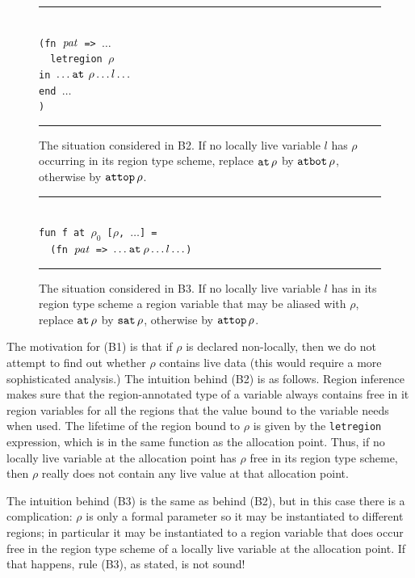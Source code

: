 \documentclass[12pt]{book}
\begin{document}
\begin{figure}
\hrule
\begin{center}
\begin{tabbing}
\\
\hskip3cm\=\tt (fn ${\it pat}$ => $\ldots$\\
       \>\ \ \=\tt letregion $\rho$ \\
       \>    \>\tt in  $\ldots\mathbin{\hbox{\tt at}}\,\rho\ldots l \ldots$\\
       \>    \>\tt end $\ldots$\\
       \>\tt )
\end{tabbing}
\end{center}
\caption{The situation considered in B2. If no locally live variable
  $l$ has $\rho$ occurring in its region type scheme, replace
  $\mathbin{\hbox{\tt at}}\,\rho$ by $\hbox{\tt atbot}\,\rho$, otherwise by $\hbox{\tt attop}\,\rho$.}
\medskip

\hrule
\label{b2.fig}
\end{figure}
\begin{figure}
\hrule
\begin{center}
\begin{tabbing}
\\
\hskip3cm\=\tt fun f at $\rho_0$ [$\rho$, $\ldots$] = \\
         \>\tt \ \ \=\tt (fn ${\it pat}$ => $\ldots\mathbin{\hbox{\tt at}}\rho\ldots l\ldots$)
\end{tabbing}
\end{center}
\caption{The situation considered in B3. If no locally live variable
  $l$ has in its region type scheme a region variable that may be
  aliased with $\rho$, replace $\mathbin{\hbox{\tt at}}\,\rho$ by $\hbox{\tt sat}\,\rho$, otherwise
  by $\hbox{\tt attop}\,\rho$.}  
\medskip
\hrule
\label{b3.fig}
\end{figure}
The motivation for (B1) is that if $\rho$ is declared non-locally,
then we do not attempt to find out whether $\rho$ contains live data (this would
require a more sophisticated analysis.) 
The intuition behind (B2) is as follows. Region inference
makes sure that the region-annotated type of a variable always contains
free in it region variables for all the regions that the value bound to the
variable needs when used. The lifetime of the region bound to 
$\rho$ is given by the {\tt letregion} expression, which is in the same function
as the allocation point. Thus,  
if no locally live variable at the allocation point
has $\rho$ free in its region type scheme,
then $\rho$ really does not contain any
live value at that allocation point.

The intuition behind (B3) is the same as behind (B2), but
in this case there is a complication: 
$\rho$ is only a formal parameter so it may
be instantiated to different regions; 
in particular it may be instantiated to 
a region variable that does occur free in the region type scheme of a
locally live variable at the allocation point. If that happens, 
rule (B3), as stated, is not sound!
\end{document}
